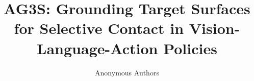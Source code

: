\def\confName{CVPR}
\def\confYear{2027} %
\title{AG3S: Grounding Target Surfaces\\for Selective Contact in Vision-Language-Action Policies}%
\author{Anonymous Authors}
